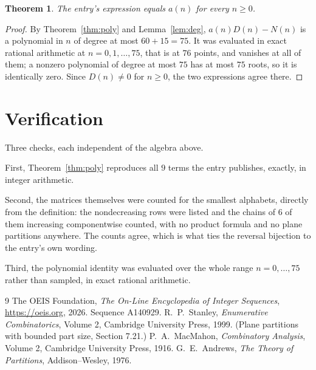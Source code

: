 \documentclass[11pt,a4paper]{article}
\theoremstyle{plain}
\newtheorem{theorem}{Theorem}
\theoremstyle{definition}
\begin{document}
\begin{theorem}
The entry's expression equals $a(n)$ for every $n\ge0$.
\end{theorem}

\begin{proof}
By Theorem~\ref{thm:poly} and Lemma~\ref{lem:deg}, $a(n)D(n)-N(n)$ is a polynomial in $n$
of degree at most $60+15=75$. It was evaluated in exact rational arithmetic at
$n=0,1,\dots,75$, that is at $76$ points, and vanishes at all of them; a nonzero polynomial
of degree at most $75$ has at most $75$ roots, so it is identically zero. Since $D(n)\neq0$
for $n\ge0$, the two expressions agree there.
\end{proof}

\section{Verification}

Three checks, each independent of the algebra above.

First, Theorem~\ref{thm:poly} reproduces all $9$ terms the entry publishes,
exactly, in integer arithmetic.

Second, the matrices themselves were counted for the smallest alphabets, directly from the
definition: the nondecreasing rows were listed and the chains of $6$ of them increasing
componentwise counted, with no product formula and no plane partitions anywhere. The counts
agree, which is what ties the reversal bijection to the entry's own wording.

Third, the polynomial identity was evaluated over the whole range $n=0,\dots,75$ rather than
sampled, in exact rational arithmetic.

\begin{thebibliography}{9}
 The OEIS Foundation, \emph{The On-Line Encyclopedia of Integer
Sequences}, \url{https://oeis.org}, 2026. Sequence A140929.
 R.~P.~Stanley, \emph{Enumerative Combinatorics}, Volume 2, Cambridge
University Press, 1999. (Plane partitions with bounded part size, Section 7.21.)
 P.~A.~MacMahon, \emph{Combinatory Analysis}, Volume 2, Cambridge
University Press, 1916.
 G.~E.~Andrews, \emph{The Theory of Partitions}, Addison--Wesley, 1976.
\end{thebibliography}
\end{document}
